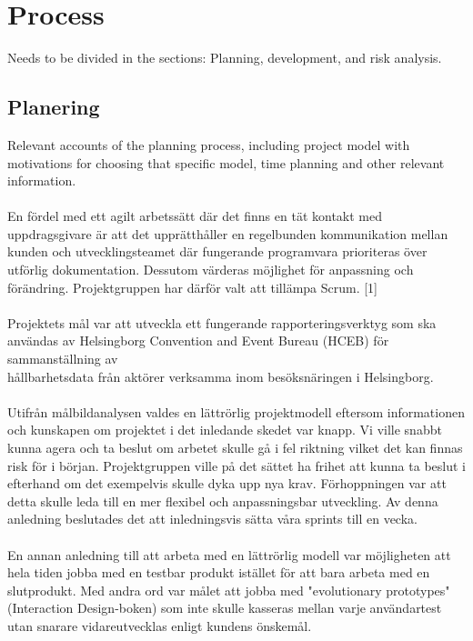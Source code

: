 \documentclass[12pt]{article}
\begin{document}
\section{Process}
Needs to be divided in the sections: Planning, development, and risk analysis.

\subsection{Planering}
Relevant accounts of the planning process, including project model with motivations for choosing that specific model, time planning and other relevant information.\\\\
En fördel med ett agilt arbetssätt där det finns en tät kontakt med uppdragsgivare är att det upprätthåller en regelbunden kommunikation mellan kunden och utvecklingsteamet där fungerande programvara prioriteras över utförlig dokumentation. Dessutom värderas möjlighet för anpassning och förändring. Projektgruppen har därför valt att tillämpa Scrum. [1] \\\\
Projektets mål var att utveckla ett fungerande rapporteringsverktyg som ska användas av Helsingborg Convention and Event Bureau (HCEB) för sammanställning av \\ hållbarhetsdata från aktörer verksamma inom besöksnäringen i Helsingborg. \\\\
Utifrån målbildanalysen valdes en lättrörlig projektmodell eftersom informationen och kunskapen om projektet i det inledande skedet var knapp. Vi ville snabbt kunna agera och ta beslut om arbetet skulle gå i fel riktning vilket det kan finnas risk för i början. Projektgruppen ville på det sättet ha frihet att kunna ta beslut i efterhand om det exempelvis skulle dyka upp nya krav. Förhoppningen var att detta skulle leda till en mer flexibel och anpassningsbar utveckling. Av denna anledning beslutades det att inledningsvis sätta våra sprints till en vecka. \\\\ 
En annan anledning till att arbeta med en lättrörlig modell var möjligheten att hela tiden jobba med en testbar produkt istället för att bara arbeta med en slutprodukt. Med andra ord var målet att jobba med "evolutionary prototypes" (Interaction Design-boken) som inte skulle kasseras mellan varje användartest utan snarare vidareutvecklas enligt kundens önskemål.\\\\
\end{document}
